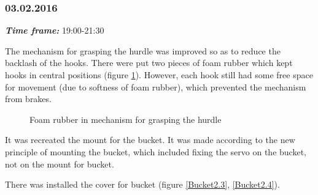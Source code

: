 \subsubsection{03.02.2016}
\textit{\textbf{Time frame:}} 19:00-21:30 

The mechanism for grasping the hurdle was improved so as to reduce the backlash of the hooks. There were put two pieces of foam rubber which kept hooks in central positions (figure \ref{Hooks1.9}). However, each hook still had some free space for movement (due to softness of foam rubber), which prevented the mechanism from brakes.

\begin{figure}[H]
	\begin{minipage}[h]{1\linewidth}
		\caption{Foam rubber in mechanism for grasping the hurdle}
		\label{Hooks1.9}
	\end{minipage}
\end{figure}

It was recreated the mount for the bucket. It was made according to the new principle of mounting the bucket, which included fixing the servo on the bucket, not on the mount for bucket. 

There was installed the cover for bucket (figure \ref{Bucket2.3}, \ref{Bucket2.4}).

